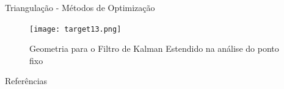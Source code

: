 \documentclass[portuguese,10pt]{beamer}
\begin{document}
\begin{frame}{Triangulação - Métodos de Optimização}
 \begin{figure}[ht]
\centering
\texttt{[image: target13.png]}
\caption{Geometria para o Filtro de Kalman Estendido na análise do ponto fixo}
\label{target13}
\end{figure}
\end{frame}


\begin{frame}{Referências}
  \printbibliography
\end{frame}
\end{document}
